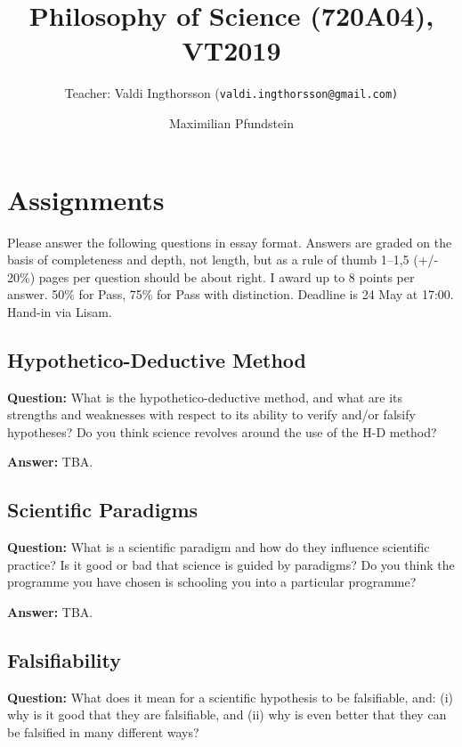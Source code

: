 \documentclass[11pt]{scrartcl}
\title{Philosophy of Science (720A04), VT2019}
\subtitle{Teacher: Valdi Ingthorsson (\texttt{valdi.ingthorsson@gmail.com)}}
\author{Maximilian Pfundstein}
\begin{document}
\maketitle

\tableofcontents

\newpage

\section{Assignments}

Please answer the following questions in essay format. Answers are graded on the basis of completeness and depth, not length, but as a rule of thumb 1–1,5 (+/- 20\%) pages per question should be about right. I award up to 8 points per answer. 50\% for Pass, 75\% for Pass with distinction. Deadline is 24 May at 17:00. Hand-in via Lisam.

\subsection{Hypothetico-Deductive Method}

\textbf{Question:} What is the hypothetico-deductive method, and what are its strengths and weaknesses with respect to its ability to verify and/or falsify hypotheses? Do you think science revolves around the use of the H-D method?

\bigbreak

\textbf{Answer:} TBA.

\subsection{Scientific Paradigms}

\textbf{Question:} What is a scientific paradigm and how do they influence scientific practice? Is it good or bad that science is guided by paradigms? Do you think the programme you have chosen is schooling you into a particular programme?

\bigbreak

\textbf{Answer:} TBA.

\subsection{Falsifiability}

\textbf{Question:} What does it mean for a scientific hypothesis to be falsifiable, and: (i) why is it good that they are falsifiable, and (ii) why is even better that they can be falsified in many different ways?
\end{document}
